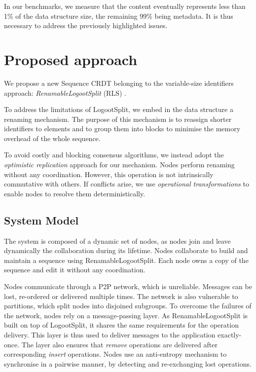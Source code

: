 \documentclass[sigplan,10pt,authorversion]{acmart}
\begin{document}
In our benchmarks, we measure that the content eventually represents less than 1\% of the data structure size, the remaining 99\% being metadata.
It is thus necessary to address the previously highlighted issues.

\section{Proposed approach}
\label{sec:proposition}

We propose a new Sequence \ac{CRDT} belonging to the variable-size identifiers approach: \emph{RenamableLogootSplit} (RLS) \cite{nicolas:hal-01932552}.

To address the limitations of LogootSplit, we embed in the data structure a renaming mechanism.
The purpose of this mechanism is to reassign shorter identifiers to elements and to group them into blocks to minimise the memory overhead of the whole sequence.

To avoid costly and blocking consensus algorithms, we instead adopt the \emph{optimistic replication} \cite{10.1145/1057977.1057980} approach for our mechanism.
Nodes perform renaming without any coordination.
However, this operation is not intrinsically commutative with others.
If conflicts arise, we use \emph{operational transformations} \cite{10.1145/289444.289469,4668339} to enable nodes to resolve them deterministically.

\subsection{System Model}

The system is composed of a dynamic set of nodes, as nodes join and leave dynamically the collaboration during its lifetime.
Nodes collaborate to build and maintain a sequence using RenamableLogootSplit.
Each node owns a copy of the sequence and edit it without any coordination.

Nodes communicate through a \ac{P2P} network, which is unreliable.
Messages can be lost, re-ordered or delivered multiple times.
The network is also vulnerable to partitions, which split nodes into disjoined subgroups.
To overcome the failures of the network, nodes rely on a message-passing layer.
As RenamableLogootSplit is built on top of LogootSplit, it shares the same requirements for the operation delivery.
This layer is thus used to deliver messages to the application exactly-once.
The layer also ensures that \emph{remove} operations are delivered after corresponding \emph{insert} operations.
Nodes use an anti-entropy mechanism to synchronise in a pairwise manner, by detecting and re-exchanging lost operations.
\end{document}
